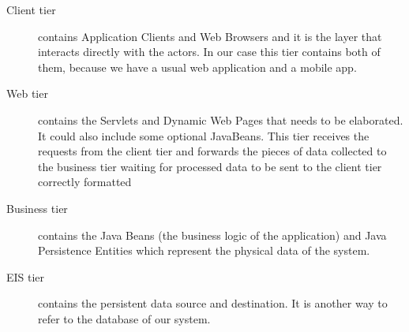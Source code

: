 	\begin{description}
		\item[Client tier] contains Application Clients and Web Browsers and it is the layer that interacts
		directly with the actors. In our case this tier contains both of them, because we have a usual web
		application and a mobile app.
		\item[Web tier] contains the Servlets and Dynamic Web Pages that needs to be elaborated. It could
		also include some optional JavaBeans. This tier receives the requests from the client tier and forwards
		the pieces of data collected to the business tier waiting for processed data to be sent
		to the client tier correctly formatted
		\item[Business tier] contains the Java Beans (the business logic of the application)	and Java
		Persistence Entities which represent the physical data of the system.
		\item[EIS tier] contains the persistent data source and destination.	It is another way to refer
		to the database of our system.
	\end{description}
	\newpage
